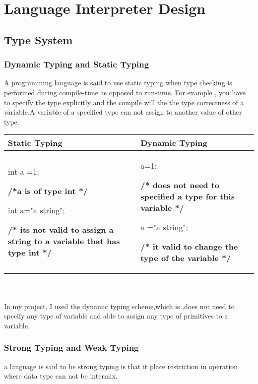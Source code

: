 \chapter{Language Interpreter Design}

\section{Type System}


\subsection{Dynamic Typing and Static Typing}
A programming language is said to use static typing when type checking is performed during compile-time as opposed to run-time. 
For example , you have to specify the type explicitly and the compile will the the type correctness of a variable.A variable of a specified type can not assign to another value of other type.

\begin{tabular}{p{5cm}|p{5cm}}
\hline
Static Typing & Dynamic Typing \\
\hline
int a =1;\par \textbf{/*a is of type int */} \par int a="a string"; \par \textbf{ /* its not valid to assign a string to a variable that has type int */} & a=1; \par \textbf{/* does not need to specified a type for this variable */} \par a ="a string"; \par
\textbf{/* it valid to change the type of the variable */} \\ 
\hline
\end{tabular} \\\\
In my project, I used the dynamic typing scheme,which is ,does not need to specify any type of variable and able to assign any type of primitives to a variable.

\subsection{Strong Typing and Weak Typing}
a language is said to be strong typing is that it place restriction in operation where data type can not be intermix.


